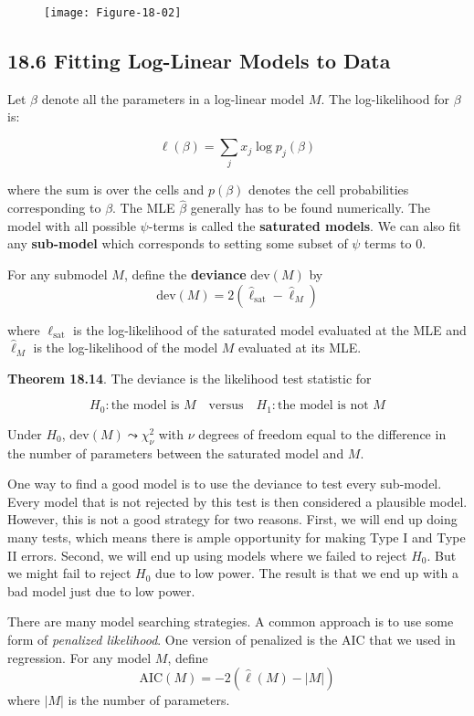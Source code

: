 \begin{figure}[H]
\centering
\texttt{[image: Figure-18-02]}
\end{figure}

\subsection*{18.6 Fitting Log-Linear Models to Data}\label{fitting-log-linear-models-to-data}

Let \(\beta\) denote all the parameters in a log-linear model \(M\). The log-likelihood for \(\beta\) is:

\[ \ell(\beta) = \sum_{j} x_{j} \log p_{j}(\beta) \]

where the sum is over the cells and \(p(\beta)\) denotes the cell probabilities corresponding to \(\beta\). The MLE \(\hat{\beta}\) generally has to be found numerically. The model with all possible \(\psi\)-terms is called the \textbf{saturated models}. We can also fit any \textbf{sub-model} which corresponds to setting some subset of \(\psi\) terms to 0.

For any submodel \(M\), define the \textbf{deviance} \(\text{dev}(M)\) by
\[ \text{dev}(M) = 2 (\hat{\ell}_\text{sat} - \hat{\ell}_M) \]

where \(\ell_\text{sat}\) is the log-likelihood of the saturated model evaluated at the MLE and \(\hat{\ell}_M\) is the log-likelihood of the model \(M\) evaluated at its MLE.

\textbf{Theorem 18.14}. The deviance is the likelihood test statistic for

\[
H_{0} : \text{the model is } M
\quad \text{versus} \quad
H_{1} : \text{the model is not } M
\]

Under \(H_{0}\), \(\text{dev}(M) \leadsto \chi^{2}_\nu\) with \(\nu\) degrees of freedom equal to the difference in the number of parameters between the saturated model and \(M\).

One way to find a good model is to use the deviance to test every sub-model. Every model that is not rejected by this test is then considered a plausible model. However, this is not a good strategy for two reasons. First, we will end up doing many tests, which means there is ample opportunity for making Type I and Type II errors. Second, we will end up using models where we failed to reject \(H_{0}\). But we might fail to reject \(H_{0}\) due to low power. The result is that we end up with a bad model just due to low power.

There are many model searching strategies. A common approach is to use some form of \emph{penalized likelihood}. One version of penalized is the AIC that we used in regression. For any model \(M\), define
\[ 
\text{AIC}(M) = -2 \left( \hat{\ell}(M) - |M|\right) 
\]
where \(|M|\) is the number of parameters.

